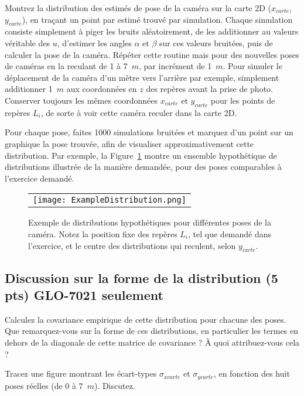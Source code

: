 \documentclass[12pt]{article}
\begin{document}
Montrez la distribution des estimés de pose de la caméra sur la carte 2D ($x_{carte}$,$y_{carte}$), en traçant un point par estimé trouvé par simulation. Chaque simulation consiste simplement à  piger les bruits aléatoirement, de les additionner au valeurs véritable des $u$,  d'estimer les angles $\alpha$ et $\beta$ sur ces valeurs bruitées, puis de calculer la pose de la caméra. Répéter cette routine mais pour des nouvelles poses de caméras en la reculant de 1 à 7~$m$, par incrément de 1~$m$. Pour simuler le déplacement de la caméra d'un mètre vers l'arrière par exemple, simplement additionner 1~$m$ aux coordonnées en $z$ des repères avant la prise de photo. Conserver toujours les mêmes coordonnées $x_{carte}$ et $y_{carte}$ pour les points de repères $L_i$, de sorte à voir cette caméra reculer dans la carte 2D.

Pour chaque pose, faites 1000 simulations bruitées et marquez d'un point sur un graphique la pose trouvée, afin de visualiser approximativement cette distribution. Par exemple, la Figure~\ref{ExampleDistribution} montre un ensemble hypothétique de distributions illustrée de la manière demandée, pour des poses comparables à l'exercice demandé.

\begin{figure}[ht]
 \begin{center}
  \begin{tabular}{c}
    \texttt{[image: ExampleDistribution.png]} 
  \end{tabular}
 \end{center}
\vspace{-0.3in}
 \caption{Exemple de distributions hypothétiques pour différentes poses de la caméra. Notez la position fixe des repères $L_i$, tel que demandé dans l'exercice, et le centre des distributions qui reculent, selon $y_{carte}$.}
 \label{ExampleDistribution}
\end{figure}


\subsection{Discussion sur la forme de la distribution  (5 pts) GLO-7021 seulement}

Calculez la covariance empirique de cette distribution pour chacune des poses. Que remarquez-vous sur la forme de ces distributions, en particulier les termes en dehors de la diagonale de cette matrice de covariance ? À quoi attribuez-vous cela ?

Tracez une figure montrant les écart-types $\sigma_{xcarte}$ et  $\sigma_{ycarte}$, en fonction des huit poses réelles  (de 0 à 7~$m$). Discutez.
\end{document}
